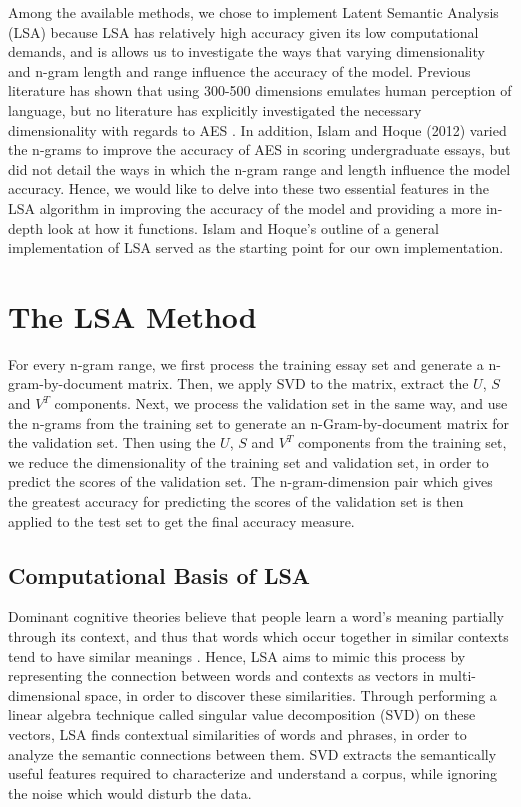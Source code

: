 \documentclass[10pt,letterpaper]{article}
\begin{document}
Among the available methods, we chose to implement Latent Semantic Analysis (LSA) because LSA has relatively high accuracy given its low computational demands, and is allows us to investigate the ways that varying dimensionality and n-gram length and range influence the accuracy of the model. Previous literature has shown that using 300-500 dimensions emulates human perception of language, but no literature has explicitly investigated the necessary dimensionality with regards to AES \cite{kintsch2002potential}. In addition, Islam and Hoque (2012) varied the n-grams to improve the accuracy of AES in scoring undergraduate essays, but did not detail the ways in which the n-gram range and length influence the model accuracy. Hence, we would like to delve into these two essential features in the LSA algorithm in improving the accuracy of the model and providing a more in-depth look at how it functions. Islam and Hoque's outline of a general implementation of LSA served as the starting point for our own implementation. 

\section{The LSA Method}

 For every n-gram range, we first process the training essay set and generate a n-gram-by-document matrix. Then, we apply SVD to the matrix, extract the $U$, $S$ and $V^{T}$ components. Next, we process the validation set in the same way, and use the n-grams from the training set to generate an n-Gram-by-document matrix for the validation set. Then using the $U$, $S$ and $V^{T}$ components from the training set, we reduce the dimensionality of the training set and validation set, in order to predict the scores of the validation set. The n-gram-dimension pair which gives the greatest accuracy for predicting the scores of the validation set is then applied to the test set to get the final accuracy measure. 

\subsection{Computational Basis of LSA}

Dominant cognitive theories believe that people learn a word's meaning partially through its context, and thus that words which occur together in similar contexts tend to have similar meanings \cite{kintsch2002potential}. Hence, LSA aims to mimic this process by representing the connection between words and contexts as vectors in multi-dimensional space, in order to discover these similarities. Through performing a linear algebra technique called singular value decomposition (SVD) on these vectors, LSA finds contextual similarities of words and phrases, in order to analyze the semantic connections between them. SVD extracts the semantically useful features required to characterize and understand a corpus, while ignoring the noise which would disturb the data. 
\end{document}

